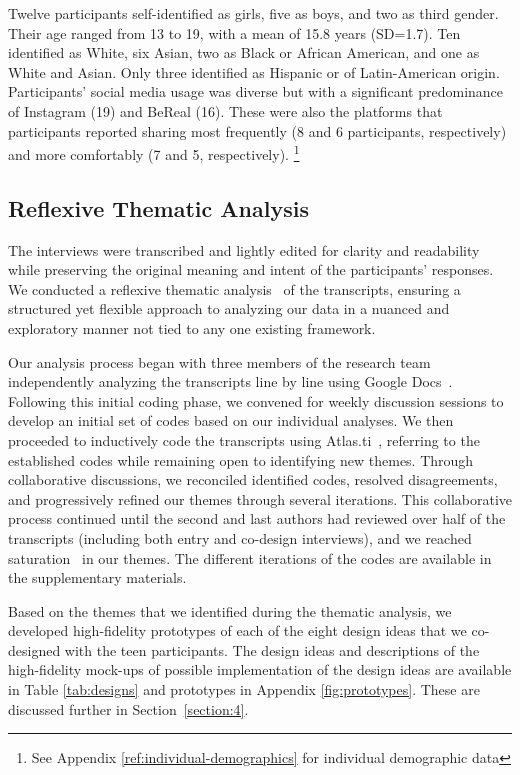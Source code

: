 Twelve participants self-identified as girls, five as boys, and two as third gender. Their age ranged from 13 to 19, with a mean of 15.8 years (SD=1.7). Ten identified as White, six Asian, two as Black or African American, and one as White and Asian. Only three identified as Hispanic or of Latin-American origin. Participants' social media usage was diverse but with a significant predominance of Instagram (19) and BeReal (16). These were also the platforms that participants reported sharing most frequently (8 and 6 participants, respectively) and more comfortably (7 and 5, respectively).
\footnote{See Appendix \ref{ref:individual-demographics} for individual demographic data}


\subsection{Reflexive Thematic Analysis}
The interviews were transcribed and lightly edited for clarity and readability while preserving the original meaning and intent of the participants' responses. We conducted a reflexive thematic analysis~\cite{braun2019reflecting} of the transcripts, ensuring a structured yet flexible approach to analyzing our data in a nuanced and exploratory manner not tied to any one existing framework.

Our analysis process began with three members of the research team independently analyzing the transcripts line by line using Google Docs~\cite{google-docs}. Following this initial coding phase, we convened for weekly discussion sessions to develop an initial set of codes based on our individual analyses. We then proceeded to inductively code the transcripts using Atlas.ti~\cite{atlas}, referring to the established codes while remaining open to identifying new themes. Through collaborative discussions, we reconciled identified codes, resolved disagreements, and progressively refined our themes through several iterations. This collaborative process continued until the second and last authors had reviewed over half of the transcripts (including both entry and co-design interviews), and we reached saturation~\cite{saunders2018saturation} in our themes. The different iterations of the codes are available in the supplementary materials.


Based on the themes that we identified during the thematic analysis, we developed high-fidelity prototypes of each of the eight design ideas that we co-designed with the teen participants. The design ideas and descriptions of the high-fidelity mock-ups of possible implementation of the design ideas are available in Table \ref{tab:designs} and prototypes in Appendix \ref{fig:prototypes}. These are discussed further in Section~\ref{section:4}.

